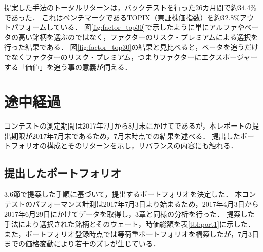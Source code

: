 ﻿\documentclass[11pt]{jreport}
\begin{document}
提案した手法のトータルリターンは，バックテストを行った26カ月間で約34.4\%であった．
これはベンチマークであるTOPIX（東証株価指数）を約32.8\%アウトパフォームしている．
図\ref{fig:factor_top30}で示したように単にアルファやベータの高い銘柄を選ぶのではなく，ファクターのリスク・プレミアムによる選択を行った結果である．
図\ref{fig:factor_top30}の結果と見比べると，ベータを追うだけでなくファクターのリスク・プレミアム，つまりファクターにエクスポージャーする「価値」を追う事の意義が伺える．

\chapter{途中経過}
コンテストの測定期間は2017年7月から8月末にかけてであるが，本レポートの提出期限が2017年7月末であるため，7月末時点での結果を述べる．
提出したポートフォリオの構成とそのリターンを示し，リバランスの内容にも触れる．
\section{提出したポートフォリオ}
3.6節で提案した手順に基づいて，提出するポートフォリオを決定した．
本コンテストのパフォーマンス計測は2017年7月3日より始まるため，2017年4月3日から2017年6月29日にかけてデータを取得し，3章と同様の分析を行った．
提案した手法により選択された銘柄とそのウェート，時価総額を表\ref{tbl:port1}に示した．
また，ポートフォリオ登録時点では等荷重ポートフォリオを構築したが，7月3日までの価格変動により若干のズレが生じている．
\end{document}
